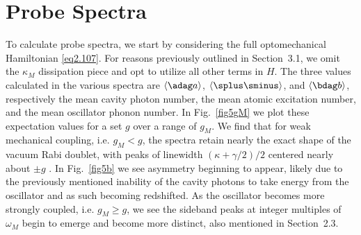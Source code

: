 \section{Probe Spectra}
To calculate probe spectra, we start by considering the full optomechanical Hamiltonian \eqref{eq2.107}. For reasons previously outlined in Section~3.1, we omit the $\kappa_M$ dissipation piece and opt to utilize all other terms in $H$. The three values calculated in the various spectra are $\langle \adag a \rangle$, $\langle \splus\sminus \rangle$, and $\langle \bdag b \rangle$, respectively the mean cavity photon number, the mean atomic excitation number, and the mean oscillator phonon number. In Fig.~\ref{fig5gM} we plot these expectation values for a set $g$ over a range of $g_M$. We find that for weak mechanical coupling, i.e. $g_M < g$, the spectra retain nearly the exact shape of the vacuum Rabi doublet, with peaks of linewidth $(\kappa + \gamma/2)/2$ centered nearly about $\pm g$ \cite{howard2}. In Fig.~\ref{fig5b} we see asymmetry beginning to appear, likely due to the previously mentioned inability of the cavity photons to take energy from the oscillator and as such becoming redshifted. As the oscillator becomes more strongly coupled, i.e. $g_M \geq g$, we see the sideband peaks at integer multiples of $\omega_M$ begin to emerge and become more distinct, also mentioned in Section~2.3.
\newpage
